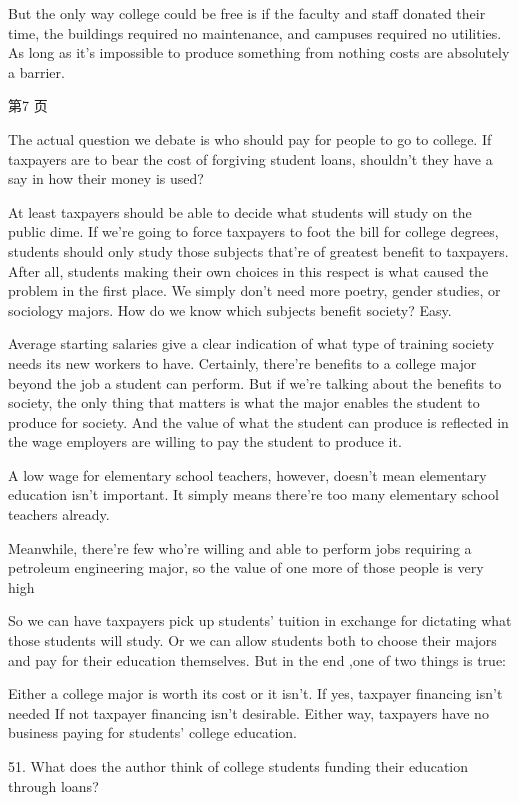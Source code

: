 \documentclass[UTF8,11pt]{ctexart}
\begin{document}
But the only way college could be free is if the faculty and staff donated their time, the buildings required no maintenance, and campuses required no utilities. As long as it's impossible to produce something from nothing costs are absolutely a barrier.


第7 页


The actual question we debate is who should pay for people to go to college. If taxpayers are to bear the cost of forgiving student loans, shouldn't they have a say in how their money is used?


At least taxpayers should be able to decide what students will study on the public dime. If we're going to force taxpayers to foot the bill for college degrees, students should only study those subjects that’re of greatest benefit to taxpayers. After all, students making their own choices in this respect is what caused the problem in the first place. We simply don't need more poetry, gender studies, or sociology majors. How do we know which subjects benefit society? Easy.


Average starting salaries give a clear indication of what type of training society needs its new workers to have. Certainly, there're benefits to a college major beyond the job a student can perform. But if we're talking about the benefits to society, the only thing that matters is what the major enables the student to produce for society. And the value of what the student can produce is reflected in the wage employers are willing to pay the student to produce it.


A low wage for elementary school teachers, however, doesn't mean elementary education isn’t important. It simply means there're too many elementary school teachers already.


Meanwhile, there're few who're willing and able to perform jobs requiring a petroleum engineering major, so the value of one more of those people is very high


So we can have taxpayers pick up students' tuition in exchange for dictating what those students will study. Or we can allow students both to choose their majors and pay for their education themselves. But in the end ,one of two things is true:


Either a college major is worth its cost or it isn't. If yes, taxpayer financing isn't needed If not taxpayer financing isn't desirable. Either way, taxpayers have no business paying for students' college education.


51. What does the author think of college students funding their education through loans?
\end{document}
